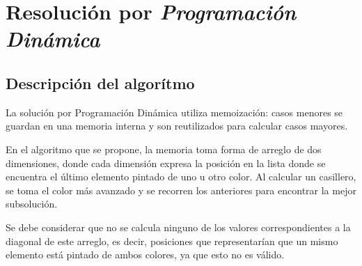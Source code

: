 \section{Resolución por \textit{Programación Dinámica}}
	\subsection{Descripción del algorítmo}

	La solución por Programación Dinámica utiliza memoización: casos menores se guardan en una memoria interna y son reutilizados para calcular casos mayores.

	En el algoritmo que se propone, la memoria toma forma de arreglo de dos dimensiones, donde cada dimensión expresa la posición en la lista donde se encuentra el último elemento pintado de uno u otro color. Al calcular un casillero, se toma el color más avanzado y se recorren los anteriores para encontrar la mejor subsolución.

	Se debe considerar que no se calcula ninguno de los valores correspondientes a la diagonal de este arreglo, es decir, posiciones que representarían que un mismo elemento está pintado de ambos colores, ya que esto no es válido.

